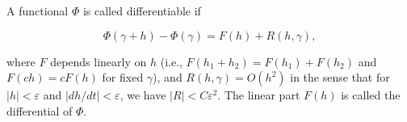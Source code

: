 A functional $\Phi$ is called differentiable if

$$\Phi(\gamma + h) - \Phi(\gamma) = F(h) + R(h, \gamma),$$

where $F$ depends linearly on $h$ (i.e., $F(h_1 + h_2) = F(h_1) + F(h_2)$ and $F(ch) = cF(h)$ for fixed $\gamma$), and $R(h, \gamma) = O(h^2)$ in the sense that for $|h| < \varepsilon$ and $|dh/dt| < \varepsilon$, we have $|R| < C\varepsilon^2$. The linear part $F(h)$ is called the differential of $\Phi$.
